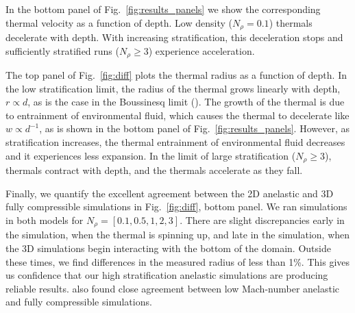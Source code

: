 In the bottom panel of Fig.~\ref{fig:results_panels} we show the corresponding thermal velocity as a function of depth.
Low density ($N_\rho = 0.1$) thermals decelerate with depth.
With increasing stratification, this deceleration stops and sufficiently stratified runs ($N_\rho \geq 3$) experience acceleration.

The top panel of Fig.~\ref{fig:diff} plots the thermal radius as a function of depth.
In the low stratification limit, the radius of the thermal grows linearly with depth, $r \propto d$, as is the case in the Boussinesq limit (\LJ).
The growth of the thermal is due to entrainment of environmental fluid, which causes the thermal to decelerate like $w \propto d^{-1}$, as is shown in the bottom panel of Fig.~\ref{fig:results_panels}.
However, as stratification increases, the thermal entrainment of environmental fluid decreases and it experiences less expansion.
In the limit of large stratification ($N_\rho \geq 3$), thermals contract with depth, and the thermals accelerate as they fall.

Finally, we quantify the excellent agreement between the 2D anelastic and 3D fully compressible simulations in Fig.~\ref{fig:diff}, bottom panel.
We ran simulations in both models for $N_\rho = [0.1, 0.5, 1, 2, 3]$.
There are slight discrepancies early in the simulation, when the thermal is spinning up, and late in the simulation, when the 3D simulations begin interacting with the bottom of the domain.
Outside these times, we find differences in the measured radius of less than 1\%.
This gives us confidence that our high stratification anelastic simulations are producing reliable results.
\citet{lecoanet&all2014} also found close agreement between low Mach-number anelastic and fully compressible simulations.

